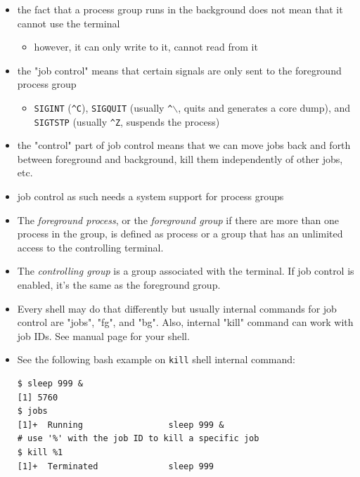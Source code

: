 \begin{itemize}
\item the fact that a process group runs in the background does not mean that it
cannot use the terminal
\begin{itemize}
  	\item however, it can only write to it, cannot read from it
\end{itemize}
\item the "job control" means that certain signals are only sent to the
foreground process group
\begin{itemize}
	\item \texttt{SIGINT} (\texttt{\^{}C}), \texttt{SIGQUIT} (usually
	\texttt{\^}{}$\backslash$, quits and generates a core dump), and
	\texttt{SIGTSTP} (usually \texttt{\^{}Z}, suspends the process)
\end{itemize}
\item the "control" part of job control means that we can move jobs back and
forth between foreground and background, kill them independently of other jobs,
etc.
\item job control as such needs a system support for process groups
\end{itemize}

\begin{itemize}
\item The \emph{foreground process}, or the \emph{foreground group} if there are
more than one process in the group, is defined as process or a group that has an
unlimited access to the controlling terminal.
\item The \emph{controlling group} is a group associated with the terminal. If
job control is enabled, it's the same as the foreground group.
\item Every shell may do that differently but usually internal commands for job
control are "jobs", "fg", and "bg". Also, internal "kill" command can work with
job IDs. See manual page for your shell.
\item See the following bash example on \texttt{kill} shell internal command:
\begin{verbatim}
$ sleep 999 &
[1] 5760
$ jobs
[1]+  Running                 sleep 999 &
# use '%' with the job ID to kill a specific job
$ kill %1
[1]+  Terminated              sleep 999
\end{verbatim}
\end{itemize}

